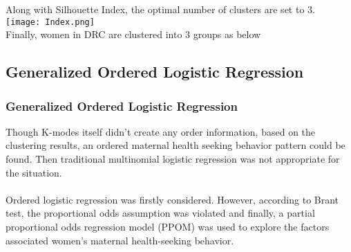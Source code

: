 \documentclass[13pt]{beamer}
\begin{document}
\begin{frame}
	\centering
	Along with Silhouette Index, the optimal number of clusters are set to 3.\\
	\texttt{[image: Index.png]}
	\\
	Finally, women in DRC are clustered into 3 groups as below
	\begin{table}[]
	\end{table}
\end{frame}

\subsection{Generalized Ordered Logistic Regression}
\begin{frame}
	\frametitle{Generalized Ordered Logistic Regression}
	Though K-modes itself didn't create any order information, based on the clustering results, an ordered maternal health seeking behavior pattern could be found. Then traditional multinomial logistic regression was not appropriate for the situation.\\
	~\\
	Ordered logistic regression was firstly considered. However, according to Brant test, the proportional odds assumption was violated and finally, a partial proportional odds regression model (PPOM) was used to explore the factors associated women's maternal health-seeking behavior. 
\end{frame}
\end{document}
